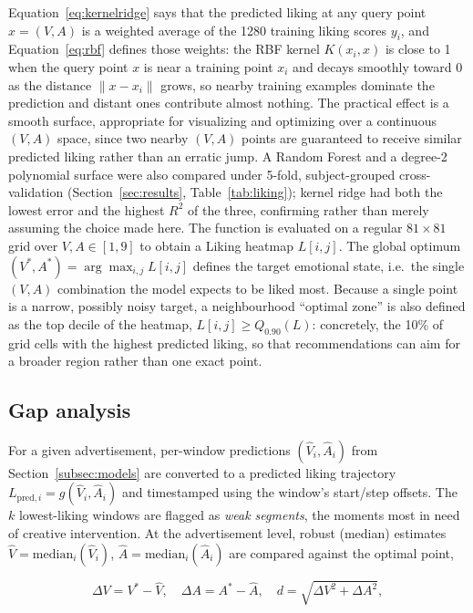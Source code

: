 \documentclass[conference]{IEEEtran}
\begin{document}
\noindent Equation~\ref{eq:kernelridge} says that the predicted liking at
any query point $x=(V,A)$ is a weighted average of the 1280 training
liking scores $y_i$, and Equation~\ref{eq:rbf} defines those weights: the
RBF kernel $K(x_i,x)$ is close to 1 when the query point $x$ is near a
training point $x_i$ and decays smoothly toward 0 as the distance
$\lVert x-x_i\rVert$ grows, so nearby training examples dominate the
prediction and distant ones contribute almost nothing. The practical
effect is a smooth surface, appropriate for visualizing and optimizing
over a continuous $(V,A)$ space, since two nearby $(V,A)$ points are
guaranteed to receive similar predicted liking rather than an erratic
jump. A Random Forest and a degree-2 polynomial surface were also
compared under 5-fold, subject-grouped cross-validation
(Section~\ref{sec:results}, Table~\ref{tab:liking}); kernel ridge had both
the lowest error and the highest $R^2$ of the three, confirming rather
than merely assuming the choice made here. The function is evaluated on
a regular $81\times81$ grid over
$V, A \in [1,9]$ to obtain a Liking heatmap $L[i,j]$. The global optimum
$(V^{*}, A^{*}) = \arg\max_{i,j} L[i,j]$ defines the target emotional
state, i.e.\ the single $(V,A)$ combination the model expects to be liked
most. Because a single point is a narrow, possibly noisy target, a
neighbourhood ``optimal zone'' is also defined as the top decile of the
heatmap, $L[i,j] \geq Q_{0.90}(L)$: concretely, the 10\% of grid cells
with the highest predicted liking, so that recommendations can aim for a
broader region rather than one exact point.

\subsection{Gap analysis}
\label{subsec:gap}

For a given advertisement, per-window predictions $(\hat V_i, \hat A_i)$
from Section~\ref{subsec:models} are converted to a predicted liking
trajectory $L_{\text{pred},i} = g(\hat V_i, \hat A_i)$ and timestamped
using the window's start/step offsets. The $k$ lowest-liking windows are
flagged as \emph{weak segments}, the moments most in need of creative
intervention. At the advertisement level, robust (median) estimates
$\hat V = \text{median}_i(\hat V_i)$, $\hat A = \text{median}_i(\hat A_i)$
are compared against the optimal point,

\begin{equation}
\Delta V = V^{*} - \hat V, \quad
\Delta A = A^{*} - \hat A, \quad
d = \sqrt{\Delta V^2 + \Delta A^2},
\label{eq:gap}
\end{equation}
\end{document}
